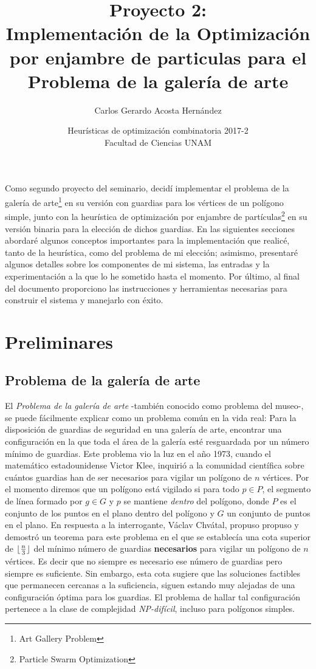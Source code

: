 \documentclass[12pt]{article}
\title{Proyecto 2:\\ Implementación de la Optimización por enjambre de particulas para el Problema de la galería de arte }
\author{Carlos Gerardo Acosta Hernández}
\date{Heurísticas de optimización combinatoria 2017-2\\ Facultad de Ciencias UNAM}
\DeclarePairedDelimiter\floor{\lfloor}{\rfloor}
\begin{document}
\maketitle
Como segundo proyecto del seminario, decidí implementar el problema de la galería de arte\footnote{Art Gallery Problem} en su
versión con guardias para los vértices de un polígono simple, junto con la heurística de optimización por
enjambre de partículas\footnote{Particle Swarm Optimization} en su versión binaria para la elección de dichos guardias. En las siguientes secciones abordaré algunos conceptos
importantes para la implementación que realicé, tanto de la heurística, como del problema de mi elección; asimismo, presentaré algunos detalles sobre los componentes de mi sistema, las
entradas y la experimentación a la que lo he sometido hasta el momento. Por último, al final del documento proporciono las instrucciones y herramientas necesarias para construir el sistema y manejarlo con éxito.
\section{Preliminares}
\subsection{Problema de la galería de arte}
El \textit{Problema de la galería de arte} -también conocido como problema del museo-, se puede fácilmente explicar como un problema común en la vida real: Para la disposición de guardias de seguridad en una
galería de arte, encontrar una configuración en la que toda el área de la galería esté resguardada por un número mínimo de guardias. Este problema vio la luz en el año 1973, cuando el matemático estadounidense Victor Klee, inquirió a la comunidad científica sobre cuántos guardias han de ser necesarios para vigilar un polígono de $n$ vértices. Por el momento diremos que un polígono está vigilado si para todo $p \in P$, el segmento de línea formado por
$g \in G$ y $p$ se mantiene \textit{dentro} del polígono, donde $P$ es el conjunto de los puntos en el plano dentro del polígono y $G$ un conjunto de puntos en el plano. En respuesta a la interrogante, Václav Chvátal, propuso propuso y demostró un teorema para este problema en el que se establecía una cota superior de $\floor{\frac{n}{3}}$ del mínimo número de guardias \textbf{necesarios} para vigilar un polígono de $n$ vértices. Es
decir que no siempre es necesario ese número de guardias pero siempre es suficiente. Sin embargo, esta cota sugiere que las soluciones factibles que permanecen cercanas a la suficiencia, siguen estando muy alejadas de
una configuración óptima para los guardias. El problema de hallar tal configuración pertenece a la clase de complejidad \textit{NP-difícil}, incluso para polígonos simples. %
\end{document}
